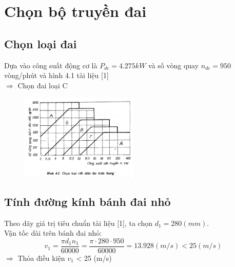 \section{Chọn bộ truyền đai}
\subsection{Chọn loại đai}
Dựa vào công suất động cơ là $P_{dc} = 4.275 kW$ và số vòng quay $n_{dc} = 950$ vòng/phút và hình 4.1 tài liệu [1]\\
$\Rightarrow$ Chọn đai loại C \\
\begin{figure}[H]
    \centering
    \includegraphics[width=0.5\textwidth]{pictures/chonloaidai.png}
\end{figure}

\subsection{Tính đường kính bánh đai nhỏ}
Theo dãy giá trị tiêu chuẩn tài liệu [1], ta chọn $d_1 = 280 (mm)$.\\
Vận tốc dài trên bánh đai nhỏ:\\
\[
    v_1 = \frac{\pi d_1 n_1}{60000} = \frac{\pi \cdot 280 \cdot 950}{60000} = 13.928 (m/s) < 25 (m/s)
\]  
$\Rightarrow$ Thỏa điều kiện $v_1$ < 25 (m/s) \\
